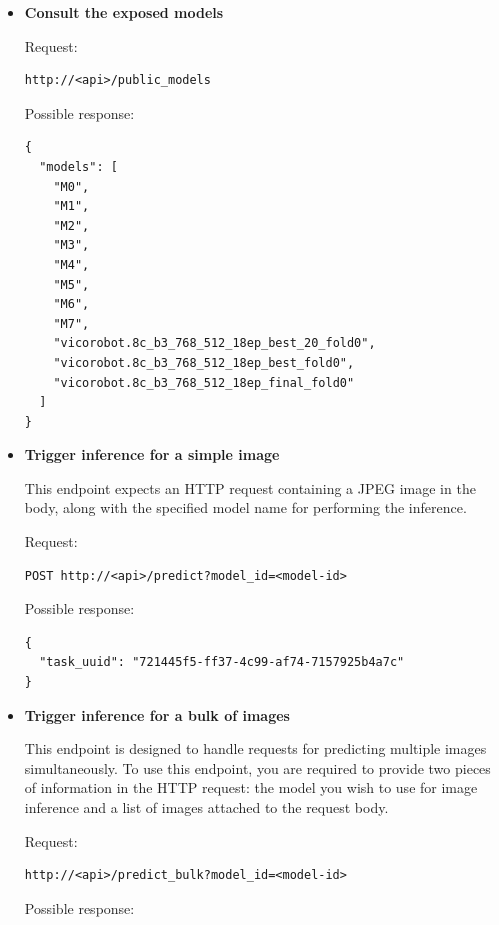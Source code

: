 \begin{itemize}
  \item {\bf Consult the exposed models}


Request:

\begin{Verbatim}[fontsize=\scriptsize]
http://<api>/public_models
\end{Verbatim}

Possible response:

\begin{Verbatim}[fontsize=\scriptsize]
{
  "models": [
    "M0",
    "M1",
    "M2",
    "M3",
    "M4",
    "M5",
    "M6",
    "M7",
    "vicorobot.8c_b3_768_512_18ep_best_20_fold0",
    "vicorobot.8c_b3_768_512_18ep_best_fold0",
    "vicorobot.8c_b3_768_512_18ep_final_fold0"
  ]
}
\end{Verbatim}



  \item {\bf Trigger inference for a simple image}

This endpoint expects an HTTP request containing a JPEG image in the body,
along with the specified model name for performing the inference.

Request:

\begin{Verbatim}[fontsize=\scriptsize]
POST http://<api>/predict?model_id=<model-id>
\end{Verbatim}

Possible response:

\begin{Verbatim}[fontsize=\scriptsize]
{
  "task_uuid": "721445f5-ff37-4c99-af74-7157925b4a7c"
}
\end{Verbatim}


  \item {\bf Trigger inference for a bulk of images}

This endpoint is designed to handle requests for predicting multiple images
simultaneously. To use this endpoint, you are required to provide two pieces of
information in the HTTP request: the model you wish to use for image inference
and a list of images attached to the request body.

Request:

\begin{Verbatim}[fontsize=\scriptsize]
http://<api>/predict_bulk?model_id=<model-id>
\end{Verbatim}

Possible response:


\end{itemize}
